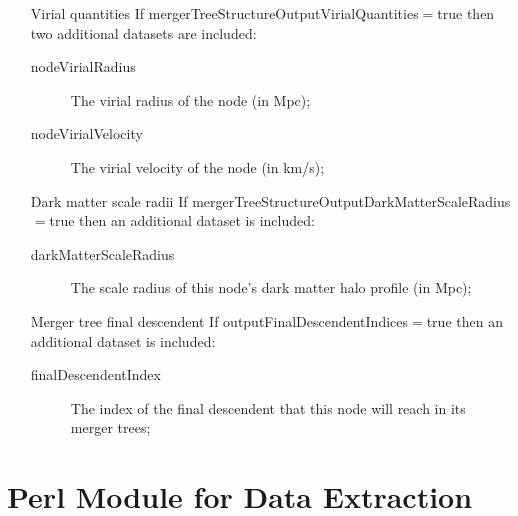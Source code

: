 \begin{itemize}
 \item [Virial quantities] If {\normalfont \ttfamily mergerTreeStructureOutputVirialQuantities}$=${\normalfont \ttfamily true} then two additional datasets are included:
 \begin{description}
  \item [{\normalfont \ttfamily nodeVirialRadius}] The virial radius of the node (in Mpc);
  \item [{\normalfont \ttfamily nodeVirialVelocity}] The virial velocity of the node (in km/s);
 \end{description}
 \item [Dark matter scale radii] If {\normalfont \ttfamily mergerTreeStructureOutputDarkMatterScaleRadius}$=${\normalfont \ttfamily true} then an additional dataset is included:
 \begin{description}
  \item [{\normalfont \ttfamily darkMatterScaleRadius}] The scale radius of this node's dark matter halo profile (in Mpc);
 \end{description}
 \item [Merger tree final descendent] If {\normalfont \ttfamily outputFinalDescendentIndices}$=${\normalfont \ttfamily true} then an additional dataset is included:
 \begin{description}
  \item [{\normalfont \ttfamily finalDescendentIndex}] The index of the final descendent that this node will reach in its merger trees;
 \end{description}
\end{itemize}

\section{Perl Module for Data Extraction}\label{sec:perlModuleDataExtraction}

